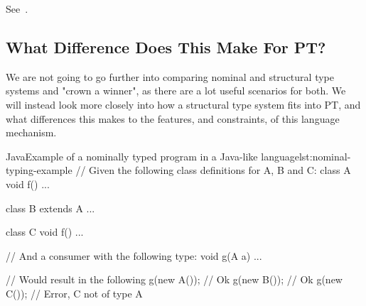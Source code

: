 See~\cite{malayeri}.

\subsection{What Difference Does This Make For PT?}\label{subsec:what-difference-does-this-make-for-pt?}

We are not going to go further into comparing nominal and structural type systems and "crown a winner", as there are a lot useful scenarios for both.
We will instead look more closely into how a structural type system fits into PT, and what differences this makes to the features, and constraints, of this language mechanism.

%
%
%
%
%




\begin{code}{Java}{Example of a nominally typed program in a Java-like language}{lst:nominal-typing-example}
    // Given the following class definitions for A, B and C:
    class A {
        void f() {
            ...
        }
    }

    class B extends A {
        ...
    }

    class C {
        void f() {
            ...
        }
    }

    // And a consumer with the following type:
    void g(A a) { ... }

    // Would result in the following
    g(new A()); // Ok
    g(new B()); // Ok
    g(new C()); // Error, C not of type A
\end{code}



